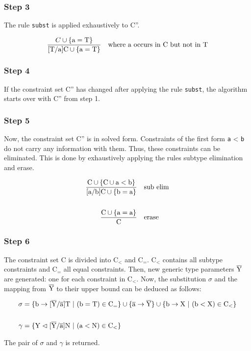 \subsubsection{Step 3}
The rule \verb|subst| is applied exhaustively to C''.

\begin{align*}
    \frac{C \cup \{ \text{a} = \text{T} \}}{ \text{[T/a]C} \cup \{ \text{a} = \text{T} \} } \quad \text{where a occurs in C but not in T}
\end{align*}

\subsubsection{Step 4}
If the constraint set C'' has changed after applying the rule \verb|subst|, the algorithm starts over with C'' from step 1.

\subsubsection{Step 5}
Now, the constraint set C'' is in solved form. Constraints of the first form \verb|a| < \verb|b| do not carry any information with them. Thus, these constraints can be eliminated.
This is done by exhaustively applying the rules subtype elimination and erase.

\begin{align*}
    \frac{\text{C} \cup \{ \text{C} \cup \text{a} < \text{b} \}}{ \text{[a/b]C} \cup \{ \text{b} = \text{a} \} } \quad &\text{sub elim}
    \\
    \\
    \frac{\text{C} \cup \{ \text{a} = \text{a} \} }{ \text{C} } \quad &\text{erase}
\end{align*}

\subsubsection{Step 6}
The constraint set C is divided into $\text{C}_<$ and $\text{C}_=$. $\text{C}_<$ contains all subtype constraints and $\text{C}_=$ all equal constraints.
Then, new generic type parameters $\overline{\text{Y}}$ are generated: one for each constraint in $\text{C}_<$. Now, the substitution $\sigma$ and the mapping from $\overline{\text{Y}}$ to their upper bound can be deduced as follows:

\begin{align*}
    \sigma &= \{ \text{b} \to \tsxsn{Y}{a}{T} \ | \ (\text{b} = \text{T}) \in \text{C}_= \} \cup \{ \ot{a} \to \ot{Y} \} \cup \{ \text{b} \to \text{X} \ | \ (\text{b} < \text{X}) \in \text{C}_< \}\\
    \\
    \gamma &= \{ \text{Y} \vartriangleleft \tsxsn{Y}{a}{N} \ | \ (\text{a} < \text{N}) \in \text{C}_< \}\\
\end{align*}

The pair of $\sigma$ and $\gamma$ is returned.
